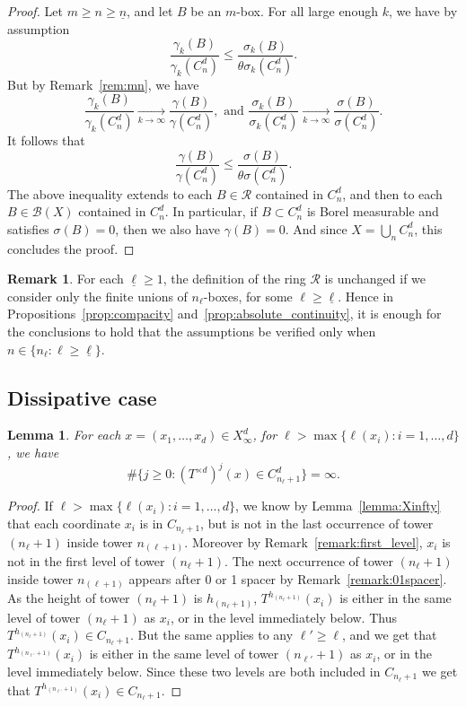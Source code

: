 \documentclass[10pt]{amsart}
\newtheorem{lemm}[theo]{Lemma}\newtheorem{prop}[theo]{Proposition}\newtheorem{coro}[theo]{Corollary}\newtheorem{conj}[theo]{Conjecture}
\theoremstyle{definition}\newtheorem{defi}[theo]{Definition}\newtheorem{rema}[theo]{Remark}\newtheorem{exam}[theo]{Example}\newtheorem{exem}[theo]{Example}\newtheorem{nota}[theo]{Notation}
\newcommand{\tend}[3][]{\xrightarrow[#2\to#3]{#1}}
\newcommand{\cd}{C^{d}}
\newcommand{\td}{T^{\times d}}
\newcommand{\lb}{\underline{\ell}}
\begin{document}
\begin{proof}
Let $m\ge n\ge \underline{n}$, and let $B$ be an $m$-box. For all large enough $k$, we have by assumption
\[
\frac{\gamma_k(B)}{\gamma_k(\cd_n)} \le
\frac{\sigma_k(B)}{\theta\sigma_k(\cd_n)}.
\]
But by Remark~\ref{rem:mn}, we have
\[
\frac{\gamma_k(B)}{\gamma_k(\cd_n)} \tend{k}{\infty}
\frac{\gamma(B)}{\gamma(\cd_n)},\text{ and }
\frac{\sigma_k(B)}{\sigma_k(\cd_n)} \tend{k}{\infty}
\frac{\sigma(B)}{\sigma(\cd_n)}.
\]
It follows that
\[
\frac{\gamma(B)}{\gamma(\cd_n)} \le \frac{\sigma(B)}{\theta\sigma(\cd_n)}.
\]
The above inequality extends to each $B\in\mathscr{R}$ contained in $\cd_n$, and then to each $B\in\mathscr{B}(X)$ contained in $\cd_n$. In particular, if $B\subset \cd_n$ is Borel measurable and satisfies $\sigma(B)=0$, then we also have $\gamma(B)=0$. And since $X=\bigcup_n \cd_n$, this concludes the proof.
\end{proof}


\begin{rema}
For each $\lb\ge1$, the definition of the ring $\mathscr{R}$ is unchanged if we consider only the finite unions of $n_\ell$-boxes, for some $\ell\ge\lb$. Hence in Propositions~\ref{prop:compacity} and~\ref{prop:absolute_continuity}, it is enough for the conclusions to hold that the assumptions be verified only when $n\in\{n_\ell:\ell\ge\lb\}$.
\end{rema}

\subsection{Dissipative case}\label{sec:dissipative}
\begin{lemm}\label{lemma:dissipative_case}
For each $x=(x_1,\ldots,x_d)\in X_\infty^d$, for $\ell >
\max\{\ell(x_i):i=1,\ldots,d\}$, we have
\[
\#\{j\ge0: (\td)^j(x)\in C_{n_\ell + 1}^d\} = \infty.
\]
\end{lemm}
\begin{proof}
If $\ell> \max\{\ell(x_i):i=1,\ldots,d\}$, we know by Lemma~\ref{lemma:Xinfty} that each coordinate $x_i$ is in $C_{n_\ell + 1}$, but is not in the last occurrence of tower $(n_\ell+1)$ inside tower $n_{(\ell+1)}$. Moreover by Remark~\ref{remark:first_level}, $x_i$ is not in the first level of tower $(n_\ell+1)$. The next occurrence of tower $(n_\ell+1)$ inside tower $n_{(\ell+1)}$ appears after 0 or 1 spacer by Remark~\ref{remark:01spacer}. As the height of tower $(n_\ell+1)$ is $h_{(n_\ell+1)}$, $T^{h_{(n_\ell+1)}}(x_i)$ is either in the same level of tower $(n_\ell+1)$ as $x_i$, or in the level immediately below. Thus $T^{h_{(n_\ell+1)}}(x_i)\in C_{n_\ell + 1}$. But the same applies to any $\ell'\ge \ell$, and we get that $T^{h_{(n_{\ell'}+1)}}(x_i)$ is either in the same level of tower $(n_{\ell'}+1)$ as $x_i$, or in the level immediately below. Since these two levels are both included in $C_{n_\ell + 1}$ we get that $T^{h_{(n_{\ell'}+1)}}(x_i)\in C_{n_\ell + 1}$.
\end{proof}
\end{document}
